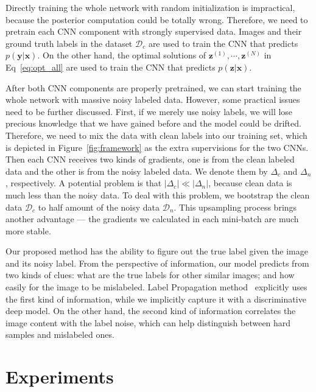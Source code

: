 \documentclass[10pt,twocolumn,letterpaper]{article}
\def\vec{\mathbf}
\begin{document}
Directly training the whole network with random initialization is impractical, because the posterior computation could be totally wrong. Therefore, we need to pretrain each CNN component with strongly supervised data. Images and their ground truth labels in the dataset $\mathcal{D}_c$ are used to train the CNN that predicts $p(\vec{y}|\vec{x})$. On the other hand, the optimal solutions of $\vec{z}^{(1)},\cdots,\vec{z}^{(N)}$ in Eq~\eqref{eq:opt_all} are used to train the CNN that predicts $p(\vec{z}|\vec{x})$.

After both CNN components are properly pretrained, we can start training the whole network with massive noisy labeled data. However, some practical issues need to be further discussed. First, if we merely use noisy labels, we will lose precious knowledge that we have gained before and the model could be drifted. Therefore, we need to mix the data with clean labels into our training set, which is depicted in Figure~\ref{fig:framework} as the extra supervisions for the two CNNs. Then each CNN receives two kinds of gradients, one is from the clean labeled data and the other is from the noisy labeled data. We denote them by $\Delta_c$ and $\Delta_n$, respectively. A potential problem is that $|\Delta_c| \ll |\Delta_n|$, because clean data is much less than the noisy data. To deal with this problem, we bootstrap the clean data $\mathcal{D}_c$ to half amount of the noisy data $\mathcal{D}_n$. This upsampling process brings another advantage --- the gradients we calculated in each mini-batch are much more stable.

Our proposed method has the ability to figure out the true label given the image and its noisy label. From the perspective of information, our model predicts from two kinds of clues: what are the true labels for other similar images; and how easily for the image to be mislabeled. Label Propagation method~\cite{zhu2002learning} explicitly uses the first kind of information, while we implicitly capture it with a discriminative deep model. On the other hand, the second kind of information correlates the image content with the label noise, which can help distinguish between hard samples and mislabeled ones.

\section{Experiments} %
\label{sec:experiments}
\end{document}
